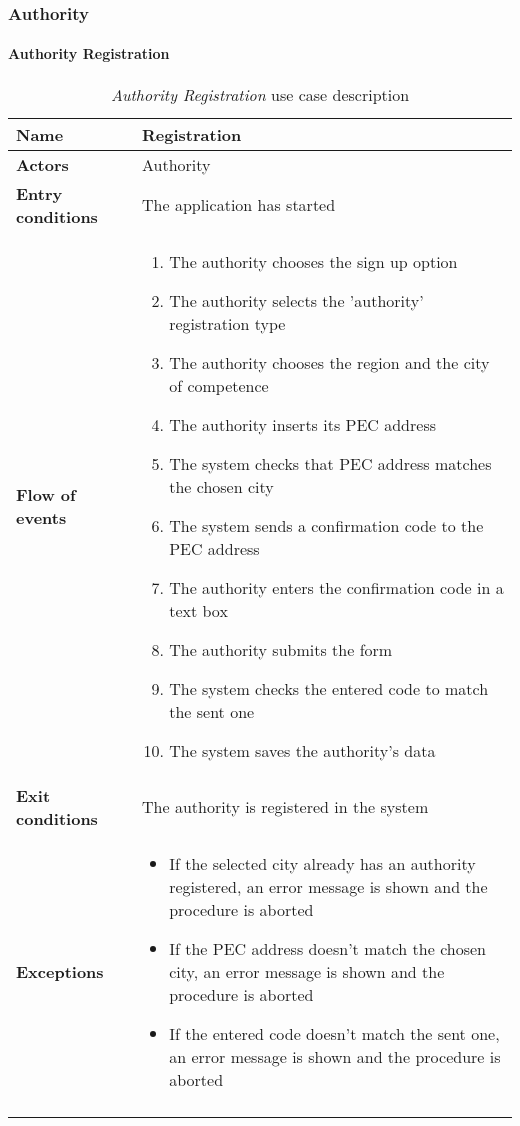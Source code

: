 	\subsubsection{Authority}
		\paragraph{Authority Registration}
			\begin{longtable}{p{0.25\linewidth}p{0.75\linewidth}}
				\toprule
				\textbf{Name} & \textbf{Registration} \\
				\midrule
				\textbf{Actors} & Authority \\
				\midrule
				\textbf{Entry conditions} & The application has started \\
				\midrule
				\textbf{Flow of events} & 
				\begin{enumerate}
					\item The authority chooses the sign up option
					\item The authority selects the 'authority' registration type
					\item The authority chooses the region and the city of competence
					\item The authority inserts its PEC address
					\item The system checks that PEC address matches the chosen city
					\item The system sends a confirmation code to the PEC address
					\item The authority enters the confirmation code in a text box
					\item The authority submits the form
					\item The system checks the entered code to match the sent one
					\item The system saves the authority's data
				\end{enumerate} \\
				\midrule
				\textbf{Exit conditions} & The authority is registered in the system\\
				\midrule
				\textbf{Exceptions} & 
				\begin{itemize}
					\item If the selected city already has an authority registered, an error message is shown and the procedure is aborted
					\item If the PEC address doesn't match the chosen city, an error message is shown and the procedure is aborted
					\item If the entered code doesn't match the sent one, an error message is shown and the procedure is aborted
				\end{itemize} \\
				\bottomrule
				\caption{\emph{Authority Registration} use case description}
			\end{longtable}
		
